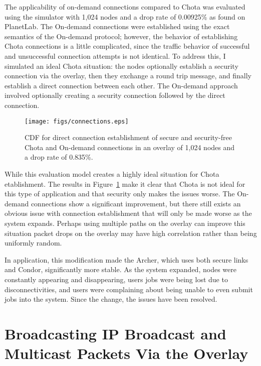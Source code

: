The applicability of on-demand connections compared to Chota was evaluated
using the simulator with 1,024 nodes and a drop rate of 0.00925\% as found on
PlanetLab.  The On-demand connections were established using the exact semantics
of the On-demand protocol; however, the behavior of establishing Chota
connections is a little complicated, since the traffic behavior of successful
and unsuccessful connection attempts is not identical.  To address this, I
simulated an ideal Chota situation:  the nodes optionally establish a security
connection via the overlay, then they exchange a round trip message, and
finally establish a direct connection between each other.  The On-demand
approach involved optionally creating a security connection followed by the
direct connection.  

\begin{figure}
\centering
\texttt{[image: figs/connections.eps]}
\caption[Time to form a direct connection]{CDF for direct connection
establishment of secure and security-free Chota and On-demand connections in an
overlay of 1,024 nodes and a drop rate of 0.835\%.}
\label{fig:connections}
\end{figure}

While this evaluation model creates a highly ideal situation for Chota
etablishment.  The results in Figure~\ref{fig:connections} make it clear that
Chota is not ideal for this type of application and that security only makes
the issues worse.  The On-demand connections show a significant improvement, but
there still exists an obvious issue with connection establishment that will
only be made worse as the system expands.  Perhaps using multiple paths on the
overlay can improve this situation packet drops on the overlay may have high
correlation rather than being uniformly random.

In application, this modification made the Archer, which uses both secure links
and Condor, significantly more stable.  As the system expanded, nodes were
constantly appearing and disappearing, users jobs were being lost due to
disconnectivities, and users were complaining about being unable to even submit
jobs into the system.  Since the change, the issues have been resolved.

\section{Broadcasting IP Broadcast and Multicast Packets Via the Overlay}


